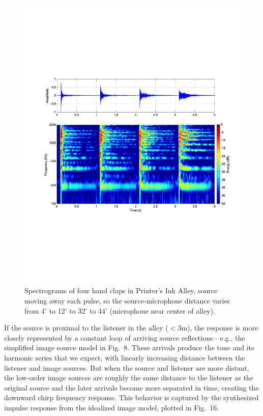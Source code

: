 \documentclass{aes137}
\begin{document}
\begin{figure}[h!] \centering \includegraphics[width=\linewidth]{images/P12C_irsg_cropped.pdf} \caption{Spectrograms of four hand claps in Printer's Ink Alley, source moving away each pulse, so the source-microphone distance varies from 4' to 12' to 32' to 44' (microphone near center of alley).} \end{figure}

If the source is proximal to the listener in the alley ($<3$m), the response is more closely represented by a constant loop of arriving source reflections---e.g., the simplified image source model in Fig.~8. These arrivals produce the tone and its harmonic series that we expect, with linearly increasing distance between the listener and image sources. But when the source and listener are more distant, the low-order image sources are roughly the same distance to the listener as the original source and the later arrivals become more separated in time, creating the downward chirp frequency response. This behavior is captured by the synthesized impulse response from the idealized image model, plotted in Fig.~16.
\end{document}
